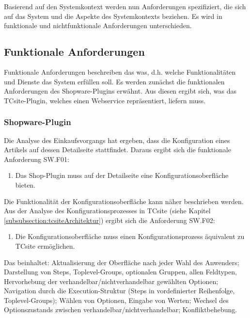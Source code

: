 \documentclass[11pt, a4paper, titlepage, listof=totoc, bibliography=totoc, index=totoc, twoside, openright, headings=normal]{scrreprt}
\begin{document}
Basierend auf den Systemkontext werden nun Anforderungen spezifiziert, die sich auf das System und die Aspekte des Systemkontexts beziehen. Es wird in funktionale und nichtfunktionale Anforderungen unterschieden.

\subsection{Funktionale Anforderungen}

Funktionale Anforderungen beschreiben das \glqq was\grqq{}, d.h. welche Funktionalitäten und Dienste das System erfüllen soll. Es werden zunächst die funktionalen Anforderungen des Shopware-Plugins erwähnt. Aus diesen ergibt sich, was das TCsite-Plugin, welches einen Webservice repräsentiert, liefern muss.

\subsubsection{Shopware-Plugin}
Die Analyse des Einkaufsvorgangs hat ergeben, dass die Konfiguration eines Artikels auf dessen Detailseite stattfindet. Daraus ergibt sich die funktionale Anforderung SW.F01:
\begin{enumerate}[SW.F01:]\bfseries
\item Das Shop-Plugin muss auf der Detailseite eine Konfigurationsoberfläche bieten.
\end{enumerate}
Die Funktionalität der Konfigurationsoberfläche kann näher beschrieben werden. Aus der Analyse des Konfigurationsprozesses in TCsite (siehe Kapitel \ref{subsubsection:tcsiteArchitektur}) ergibt sich die Anforderung SW.F02:
\begin{enumerate}[SW.F02:]\bfseries
\item Die Konfigurationsoberfläche muss einen Konfigurationsprozess äquivalent zu TCsite ermöglichen. 
\end{enumerate}
Das beinhaltet: Aktualisierung der Oberfläche nach jeder Wahl des Anwenders; Darstellung von Steps, Toplevel-Groups, optionalen Gruppen, allen Feldtypen, Hervorhebung der verhandelbar/nichtverhandelbar gewählten Optionen; Navigation durch die Execution-Struktur (Steps in vordefinierter Reihenfolge, Toplevel-Groups); Wählen von Optionen, Eingabe von Werten; Wechsel des Optionszustands zwischen verhandelbar/nichtverhandelbar; Konfliktbehebung.
\end{document}
